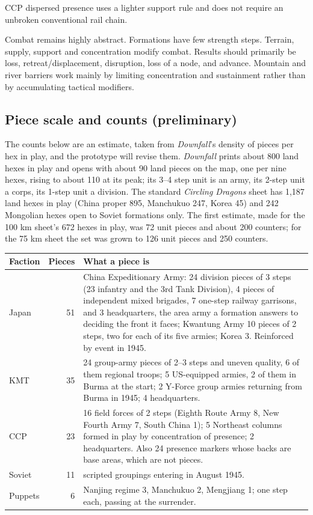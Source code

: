 \documentclass[11pt]{article}
\begin{document}
CCP dispersed presence uses a lighter support rule and does not require an unbroken conventional rail chain.

Combat remains highly abstract. Formations have few strength steps. Terrain, supply, support and concentration modify combat. Results should primarily be loss, retreat/displacement, disruption, loss of a node, and advance. Mountain and river barriers work mainly by limiting concentration and sustainment rather than by accumulating tactical modifiers.

\subsection{Piece scale and counts (preliminary)}\label{sub:pieces}
The counts below are an estimate, taken from \emph{Downfall}'s density of pieces per hex in play, and the prototype will revise them. \emph{Downfall} prints about 800 land hexes in play and opens with about 90 land pieces on the map, one per nine hexes, rising to about 110 at its peak; its 3--4 step unit is an army, its 2-step unit a corps, its 1-step unit a division. The standard \emph{Circling Dragons} sheet has 1,187 land hexes in play (China proper 895, Manchukuo 247, Korea 45) and 242 Mongolian hexes open to Soviet formations only. The first estimate, made for the 100 km sheet's 672 hexes in play, was 72 unit pieces and about 200 counters; for the 75 km sheet the set was grown to 126 unit pieces and 250 counters.

\begin{center}
\begin{tabular}{lrp{}}
\toprule Faction & Pieces & What a piece is \\\midrule
Japan & 51 & China Expeditionary Army: 24 division pieces of 3 steps (23 infantry and the 3rd Tank Division), 4 pieces of independent mixed brigades, 7 one-step railway garrisons, and 3 headquarters, the area army a formation answers to deciding the front it faces; Kwantung Army 10 pieces of 2 steps, two for each of its five armies; Korea 3. Reinforced by event in 1945.\\
KMT & 35 & 24 group-army pieces of 2--3 steps and uneven quality, 6 of them regional troops; 5 US-equipped armies, 2 of them in Burma at the start; 2 Y-Force group armies returning from Burma in 1945; 4 headquarters.\\
CCP & 23 & 16 field forces of 2 steps (Eighth Route Army 8, New Fourth Army 7, South China 1); 5 Northeast columns formed in play by concentration of presence; 2 headquarters. Also 24 presence markers whose backs are base areas, which are not pieces.\\
Soviet & 11 & scripted groupings entering in August 1945.\\
Puppets & 6 & Nanjing regime 3, Manchukuo 2, Mengjiang 1; one step each, passing at the surrender.\\
\bottomrule
\end{tabular}
\end{center}
\end{document}
